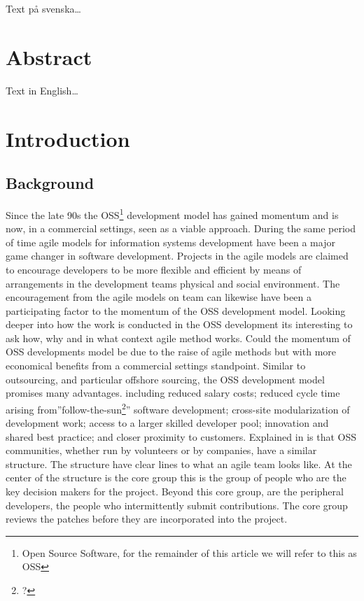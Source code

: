 \documentclass[a4paper,11pt]{article}
\begin{document}
{Text på svenska\ldots

\newpage

\mbox{}

\newpage

\section*{Abstract}

Text in English\ldots

\newpage

\mbox{}

\newpage
\tableofcontents
\newpage
\ifodd\value{page}\else\mbox{}\newpage\fi
\setcounter{page}{1}
\renewcommand{\thepage}{\rempage}

\section{Introduction}

\subsection{Background}
Since the late 90s the OSS\footnote{Open Source Software, for the remainder of this article we will refer to this as OSS} development model has gained momentum and is now, in a commercial settings, seen as a viable approach\cite{Author2008}. During the same period of time agile models for information systems development have been a major game changer in software development. Projects in the agile models are claimed to encourage developers to be more flexible and efficient by means of arrangements in the development teams physical and social environment\cite{Jansson2015}. The encouragement from the agile models on team can likewise have been a participating factor to the momentum of the OSS development model. Looking  deeper into how the work is conducted in the OSS development its interesting to ask how, why and in what context agile method works. Could the momentum of OSS developments model be due to the raise of agile methods but with more economical benefits from a commercial settings standpoint. Similar to outsourcing, and particular offshore sourcing, the OSS development model promises many advantages. including reduced salary costs; reduced cycle time arising from''follow-the-sun\footnote{?}'' software development; cross-site modularization of development work; access to a larger skilled developer pool; innovation and shared best practice; and closer proximity to customers\cite{Author2008}. Explained in \cite{Crowston2006} is that OSS communities, whether run by volunteers or by companies, have a similar structure. The structure have clear lines to what an agile team looks like. At the center of the structure is the core group this is the group of people who are the key decision makers for the project. Beyond this core group, are the peripheral developers, the people who intermittently submit contributions. The core group reviews the patches before they are incorporated into the project. \cite{Crowston2006}

}
\end{document}
